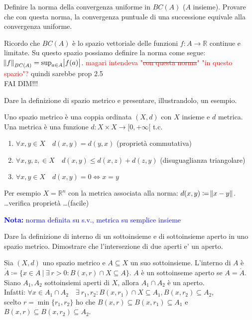 \documentclass{exam}
\newcommand{\R}[0]{\mathbb{R}}
\newcommand{\err}[1]{\textcolor{red}{#1}}
\newcommand{\nota}[1]{\textcolor{blue}{\textbf{Nota: }#1}}
\begin{document}
\begin{questions}
\question Definire la norma della convergenza uniforme in $BC(A)$ ($A$ insieme). Provare che con questa norma, la convergenza puntuale di una successione equivale alla convergenza uniforme.
\begin{solution}
    Ricordo che $BC(A)$ è lo spazio vettoriale delle funzioni $f: A \rightarrow \R $ continue e limitate. Su questo spazio possiamo definire la norma come segue: $\norm{f}_{BC(A)} = \sup_{a \in A} \abs{f(a)}$.
    \err{magari intendeva "\sout{con questa norma}" "in questo spazio"?} quindi sarebbe prop 2.5\\
    FAI DIM!!!
\end{solution}

\question Dare la definizione di spazio metrico e presentare, illustrandolo, un esempio.
\begin{solution}
    Uno spazio metrico è una coppia ordinata $(X,d)$ con $X$ insieme e $d$ metrica. Una metrica è una funzione $d: X \times X \rightarrow [0,+\infty[$ t.c.
    \begin{enumerate}
        \item $\forall x, y \in X \quad d(x,y) = d(y,x)$ \quad (proprietà commutativa)
        \item $\forall x,y,z, \in X \quad d(x,y) \leq d(x,z) + d(z,y)$ \quad (disuguaglianza triangolare)
        \item $\forall x, y \in X \quad d(x,y)=0 \iff x=y$
    \end{enumerate}
    Per esempio $X = \R^n $ con la metrica associata alla norma: $d(x,y) \coloneqq \norm{x-y}$.\\
    \dots verifica proprietà \dots (facile)
\end{solution}
\nota{norma definita su s.v., metrica su semplice insieme}

\question Dare la definizione di interno di un sottoinsieme e di sottoinsieme aperto in uno spazio metrico. Dimostrare che l’intersezione di due aperti e’ un aperto.
\begin{solution}
    Sia $(X,d)$ uno spazio metrico e $A\subseteq X$ un suo sottoinsieme. L'interno di $A$ è $\mathring{A} \coloneqq \{x \in A \ |\ \exists \  r >0 : B(x,r) \cap X \subseteq A\} $.
    $A$ è un sottoinseme aperto se $A=\mathring{A}$.\\
    Siano $A_1, A_2$ sottoinsiemi aperti di $X$, allora $A_1 \cap A_2$ è un aperto.\\
    Infatti: $\forall x \in A_1 \cap A_2 \quad \exists\  r_1,r_2 : B(x,r_1) \cap X \subseteq A_1, B(x,r_2) \subseteq A_2$,\\
    scelto $r=\min\{r_1, r_2\}$ ho che $B(x,r)\subseteq B(x,r_1) \subseteq A_1$ e $B(x,r)\subseteq B(x,r_2) \subseteq A_2$.
\end{solution}


\end{questions}
\end{document}
